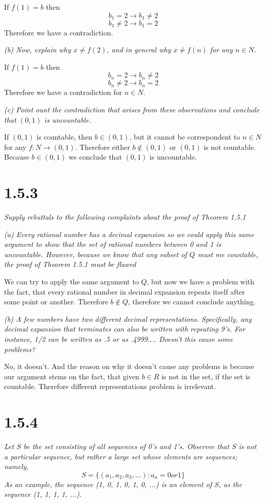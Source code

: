 \documentclass[11pt,oneside,titlepage]{article}
\begin{document}
If $f(1) = b$ then
$$b_1 = 2 \to b_1 \neq 2$$
$$b_1 \neq 2 \to b_1 = 2$$
Therefore we have a contradiction.

\textit{(b) Now, explain why $x \neq f(2)$, and in general why $x \neq f(n)$ for any
  $n \in N$. }

If $f(1) = b$ then
$$b_n = 2 \to b_n \neq 2$$
$$b_n \neq 2 \to b_n = 2$$
Therefore we have a contradiction for $n \in N$.

\textit{(c) Point ount the contradiction that arises from these observations and
  conclude that $(0, 1)$ is uncountable.}

If $(0,1)$ is countable, then $b \in (0, 1)$, but it cannot be correspondent
to $n \in N$ for any $f: N \to (0, 1)$. Therefore either $b \notin (0, 1)$ or
$(0, 1)$ is not countable. Because $b \in (0, 1)$ we conclude that $(0, 1)$ is
uncountable.

\section*{1.5.3}
\textit{Supply rebuttals to the following complaints about the proof of
  Theorem 1.5.1}

\textit{(a) Every rational number has a decimal expansion so we could apply
  this same argument to show that the set of rational numbers between 0 and 1
  is uncountable. However, because we know that any subset of $Q$ must me countable,
  the proof of Theorem 1.5.1 must be flawed}

We can try to apply the same argument to $Q$, but now we have a problem with the
fact, that every rational number in decimal expansion repeats itself after some
point or another. Therefore $b \notin Q$, therefore we cannot conclude anything.

\textit{(b) A few numbers have two different decimal representations. Specifically,
  any decimal expansion that terminates can also be written with repeating 9's.
  For instance, 1/2 can be written as .5 or as .4999.... Doesn't this cause some
  problems?}

No, it doesn't. And the reason on why it doesn't cause any problems is because
our argument stems on the fact, that given $b \in R$ is not in the set,
if the set is countable. Therefore different representations problem is irrelevant.

\section*{1.5.4}
\textit{Let $S$ be the set consisting of all sequences of 0's and 1's. Observee that $S$
  is not a particular sequence, but rather a large set whose elements are sequences;
  namely,}
$$S = \{(a_1, a_2, a_3,...): a_n = 0 or 1\}$$
\textit{As an example, the sequence (1, 0, 1, 0, 1, 0, ...) is an element of $S$, as the
  sequence (1, 1, 1, 1, ...).}
\end{document}
